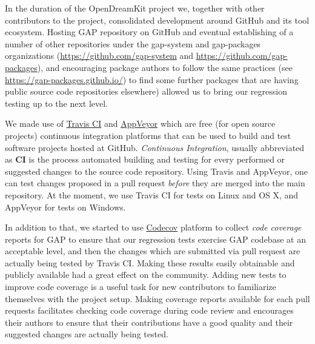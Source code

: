 In the duration of the OpenDreamKit project we, together with other
contributors to the \GAP project, consolidated \GAP development 
around GitHub and its tool ecosystem.
Hosting GAP repository on GitHub and eventual establishing of a number
of other repositories under the gap-system and gap-packages 
organizations (\url{https://github.com/gap-system} and 
\url{https://github.com/gap-packages}), and encouraging package authors 
to follow the same practices (see \url{https://gap-packages.github.io/})
to find some further packages that are having public source code 
repositories elsewhere) allowed us to bring our regression testing
up to the next level.


We made use of \href{https://travis-ci.org/}{Travis CI} and
\href{https://www.appveyor.com/}{AppVeyor} which are 
free (for open source projects) continuous integration platforms 
that can be used to build and test software projects hosted at GitHub.
\emph{Continuous Integration}, usually abbreviated as {\bf CI} is the process
automated building and testing for every performed or suggested changes to 
the source code repository. Using Travis and AppVeyor, one can test changes proposed
in a pull request \emph{before} they are merged into the main repository.
At the moment, we use Travis CI for tests on Linux and OS X, and 
AppVeyor for tests on Windows.

In addition to that, we started to use \href{https://codecov.io/}{Codecov}
platform to collect \emph{code coverage} reports for GAP to ensure that our
regression tests exercise GAP codebase at an acceptable level, and then
the changes which are submitted via pull request are actually being tested
by Travis CI. Making these results easily obtainable and publicly available
had a great effect on the community. Adding new tests to improve code coverage
is a useful task for new contributors to familiarize themselves with the
project setup. Making coverage reports available for each pull requests
facilitates checking code coverage during code review and
encourages their authors to ensure that their contributions have a good
quality and their suggested changes are actually being tested. 

